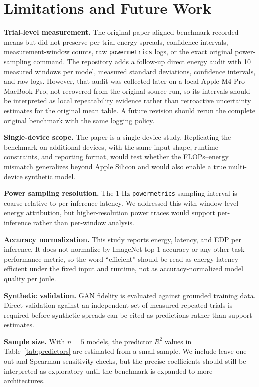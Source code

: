 \documentclass[conference]{IEEEtran}
\begin{document}
\section{Limitations and Future Work}
\label{sec:limitations}
\textbf{Trial-level measurement.} The original paper-aligned benchmark
recorded means but did not preserve per-trial energy spreads, confidence
intervals, measurement-window counts, raw \texttt{powermetrics} logs, or the
exact original power-sampling command. The repository adds a follow-up direct
energy audit with 10 measured windows per model, measured standard deviations,
confidence intervals, and raw logs. However, that audit was collected later on
a local Apple M4 Pro MacBook Pro, not recovered from the original source run, so
its intervals should be interpreted as local repeatability evidence rather
than retroactive uncertainty estimates for the original mean table. A future
revision should rerun the complete original benchmark with the same logging
policy.

\textbf{Single-device scope.} The paper is a single-device study. Replicating
the benchmark on additional devices, with the same input shape, runtime
constraints, and reporting format, would test whether the FLOPs--energy
mismatch generalizes beyond Apple Silicon and would also enable a true
multi-device synthetic model.

\textbf{Power sampling resolution.} The 1 Hz \texttt{powermetrics} sampling
interval is coarse relative to per-inference latency. We addressed this with
window-level energy attribution, but higher-resolution power traces would
support per-inference rather than per-window analysis.

\textbf{Accuracy normalization.} This study reports energy, latency, and EDP
per inference. It does not normalize by ImageNet top-1 accuracy or any other
task-performance metric, so the word ``efficient'' should be read as
energy-latency efficient under the fixed input and runtime, not as
accuracy-normalized model quality per joule.

\textbf{Synthetic validation.} GAN fidelity is evaluated against grounded
training data. Direct validation against an independent set of measured
repeated trials is required before synthetic spreads can be cited as
predictions rather than support estimates.

\textbf{Sample size.} With $n = 5$ models, the predictor $R^2$ values in
Table~\ref{tab:predictors} are estimated from a small sample. We include
leave-one-out and Spearman sensitivity checks, but the precise coefficients
should still be interpreted as exploratory until the benchmark is expanded to
more architectures.
\end{document}

